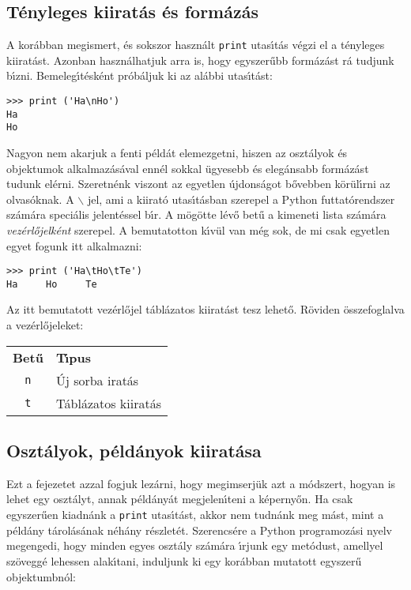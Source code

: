\subsection{T\'enyleges kiirat\'as \'es form\'az\'as}

A kor\'abban megismert, \'es sokszor haszn\'alt {\tt print} utas\'{\i}t\'as v\'egzi el a t\'enyleges kiirat\'ast. 
Azonban haszn\'alhatjuk arra is, hogy egyszer\H{u}bb form\'az\'ast r\'a tudjunk b\'{\i}zni. Bemeleg\'{\i}t\'esk\'ent 
pr\'ob\'aljuk ki az al\'abbi utas\'{\i}t\'ast:

\begin{Verbatim}[fontsize=\small]
>>> print ('Ha\nHo')
Ha
Ho
\end{Verbatim}

Nagyon nem akarjuk a fenti p\'eld\'at elemezgetni, hiszen az oszt\'alyok \'es objektumok alkalmaz\'as\'aval enn\'el 
sokkal \"ugyesebb \'es eleg\'ansabb form\'az\'ast tudunk el\'erni. Szeretn\'enk viszont az egyetlen \'ujdons\'agot 
b\H{o}vebben k\"or\"ul\'{\i}rni az olvas\'oknak. A $\backslash$ jel, ami a kiirat\'o utas\'{\i}t\'asban szerepel a 
Python futtat\'orendszer sz\'am\'ara speci\'alis jelent\'essel b\'{\i}r. A m\"og\"otte l\'ev\H{o} bet\H{u} a kimeneti 
lista sz\'am\'ara {\sl vez\'erl\H{o}jelk\'ent} szerepel. A bemutatotton k\'{\i}v\"ul van m\'eg sok, de mi csak egyetlen 
egyet fogunk itt alkalmazni:

\begin{Verbatim}[fontsize=\small]
>>> print ('Ha\tHo\tTe')
Ha     Ho     Te
\end{Verbatim}

Az itt bemutatott vez\'erl\H{o}jel t\'abl\'azatos kiirat\'ast tesz lehet\H{o}. R\"oviden \"osszefoglalva a 
vez\'erl\H{o}jeleket:

\begin{center}
   \begin{tabular}{cl}
      {\bf Bet\H{u}} & {\bf T\'{\i}pus} \\
      {\tt n} & \'Uj sorba irat\'as \\
      {\tt t} & T\'abl\'azatos kiirat\'as \\      
   \end{tabular}
\end{center}

\subsection{Oszt\'alyok, p\'eld\'anyok kiirat\'asa}

Ezt a fejezetet azzal fogjuk lez\'arni, hogy megimserj\"uk azt a m\'odszert, hogyan is lehet egy oszt\'alyt, 
annak p\'eld\'any\'at megjelen\'{\i}teni a k\'eperny\H{o}n. Ha csak egyszer\H{u}en kiadn\'ank a {\tt print} 
utas\'{\i}t\'ast, akkor nem tudn\'ank meg m\'ast, mint a p\'eld\'any t\'arol\'as\'anak n\'eh\'any r\'eszlet\'et. 
Szerencs\'ere a Python programoz\'asi nyelv megengedi, hogy minden egyes oszt\'aly sz\'am\'ara \'{\i}rjunk egy 
met\'odust, amellyel sz\"ovegg\'e lehessen alak\'{\i}tani, induljunk ki egy kor\'abban mutatott egyszer\H{u} 
objektumbn\'ol:

